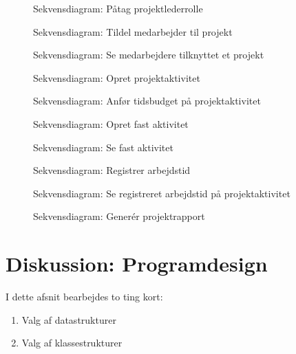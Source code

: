 \begin{figure}[H]
    \centering
    \caption{Sekvensdiagram: Påtag projektlederrolle}\label{fig:sequenceTakePLRole}
\end{figure}
\begin{figure}[H]
    \centering
    \caption{Sekvensdiagram: Tildel medarbejder til projekt}\label{fig:sequenceAssignEmployee}
\end{figure}
\begin{figure}[H]
    \centering
    \caption{Sekvensdiagram: Se medarbejdere tilknyttet et projekt}\label{fig:ViewAssignedEmployee}
\end{figure}
\begin{figure}[H]
    \centering
    \caption{Sekvensdiagram: Opret projektaktivitet}\label{fig:sequenceCreateProjectActivity}
\end{figure}
\begin{figure}[H]
    \centering
    \caption{Sekvensdiagram: Anfør tidsbudget på projektaktivitet}\label{fig:sequenceSetTimeBudget}
\end{figure}
\begin{figure}[H]
    \centering
    \caption{Sekvensdiagram: Opret fast aktivitet}\label{fig:sequenceCreateRegularActivity}
\end{figure}
\begin{figure}[H]
    \centering
    \caption{Sekvensdiagram: Se fast aktivitet}\label{fig:sequenceViewRegularActivity}
\end{figure}
\begin{figure}[H]
    \centering
    \caption{Sekvensdiagram: Registrer arbejdstid}\label{fig:sequenceRegisterWorktime}
\end{figure}
\begin{figure}[H]
    \centering
    \caption{Sekvensdiagram: Se registreret arbejdstid på projektaktivitet}\label{fig:sequenceViewWorktime}
\end{figure}
\begin{figure}[H]
    \centering
    \caption{Sekvensdiagram: Generér projektrapport}\label{fig:sequenceGenerateProjectReport}
\end{figure}
\section{Diskussion: Programdesign}
I dette afsnit bearbejdes to ting kort:
\begin{enumerate}
    \item Valg af datastrukturer
    \item Valg af klassestrukturer
\end{enumerate}
